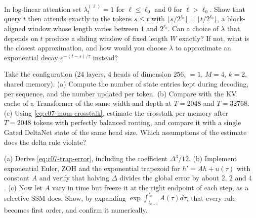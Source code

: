 \begin{exercise}\label{ex:c07-window}
In log-linear attention set $\lambda_t^{(\ell)} = 1$ for $\ell\le\ell_0$ and $0$ for $\ell > \ell_0$.
Show that query $t$ then attends exactly to the tokens $s\le t$ with
$\lfloor s/2^{\ell_0}\rfloor = \lfloor t/2^{\ell_0}\rfloor$, a block-aligned window whose length
varies between $1$ and $2^{\ell_0}$. Can a choice of $\lambda$ that depends on $t$ produce a sliding
window of fixed length $W$ exactly? If not, what is the closest approximation, and how would
you choose $\lambda$ to approximate an exponential decay $e^{-(t-s)/\tau}$ instead?
\end{exercise}

\begin{exercise}\label{ex:c07-mom-budget}
Take the configuration 
($24$ layers, $4$ heads of dimension $256$,  $=1$, $M = 4$, $k = 2$, shared memory).
(a) Compute the number of state entries kept during decoding, per sequence, and the number
updated per token. (b) Compare with the KV cache of a Transformer of the same width and depth
at $T = 2048$ and $T = 32768$. (c) Using \cref{eq:c07-mom-crosstalk}, estimate the crosstalk per
memory after $T = 2048$ tokens with perfectly balanced routing, and compare it with a
single Gated DeltaNet state of the same head size. Which assumptions of the estimate does
the delta rule violate?
\end{exercise}

\begin{exercise}\label{ex:c07-trap}
(a) Derive \cref{eq:c07-trap-error}, including the coefficient $\Delta^3/12$.
(b) Implement exponential Euler, ZOH and the exponential trapezoid for
$h' = A h + u(\tau)$ with constant $A$ and verify that halving $\Delta$ divides the global error
by about $2$, $2$ and $4$. (c) Now let $A$ vary in time but freeze it at the right endpoint of
each step, as a selective SSM does. Show, by expanding $\exp\int_{t_{k-1}}^{t_k}A(\tau)d\tau$,
that every rule becomes first order, and confirm it numerically.
\end{exercise}

